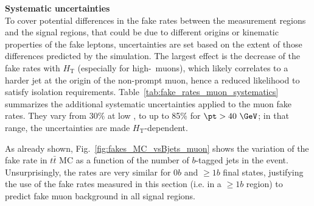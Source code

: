 \begin{table}[t!]
\def\arraystretch{1.15}
\caption{Additional systematic uncertainty on the muon fake rates, to address variations of the latter in different environments. 
The table also shows the correction factors and uncertainties applied to final states with $\ge 2$ $b$-tagged jets.}
\label{tab:fake_rates_muon_systematics}
\def\arraystretch{1.15}
\centering
{}
\end{table}


\par{\bf Systematic uncertainties\\}
To cover potential differences in the fake rates between the measurement regions and the signal regions, 
that could be due to different origins or kinematic properties of the fake leptons, 
uncertainties are set based on the extent of those differences predicted by the simulation. 
The largest effect is the decrease of the fake rates with $H_\mathrm{T}$ (especially for high-\pt\ muons), 
which likely correlates to a harder jet at the origin of the non-prompt muon, hence a reduced likelihood to satisfy isolation requirements. 
Table~\ref{tab:fake_rates_muon_systematics} summarizes the additional systematic uncertainties applied to the muon fake rates. 
They vary from $30\%$ at low \pt, to up to 85\% for $\pt>40~\GeV$; in that range, the uncertainties are made $H_\mathrm{T}$-dependent. 

As already shown, Fig.~\ref{fig:fakes_MC_vsBjets_muon} shows the variation of the fake rate in $t\bar t$ MC as a function of the number of $b$-tagged jets in the event. 
Unsurprisingly, the rates are very similar for $0b$ and $\ge 1b$ final states, 
justifying the use of the fake rates measured in this section (i.e. in a $\ge 1b$ region) to predict fake muon background in all signal regions. 

